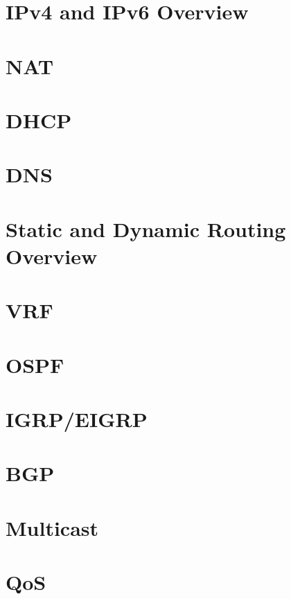 \documentclass{article}
\begin{document}
\section*{IPv4 and IPv6 Overview}

\section*{NAT}

\section*{DHCP}

\section*{DNS}

\section*{Static and Dynamic Routing Overview}

\section*{VRF}

\section*{OSPF}

\section*{IGRP/EIGRP}

\section*{BGP}

\section*{Multicast}

\section*{QoS}
\end{document}
